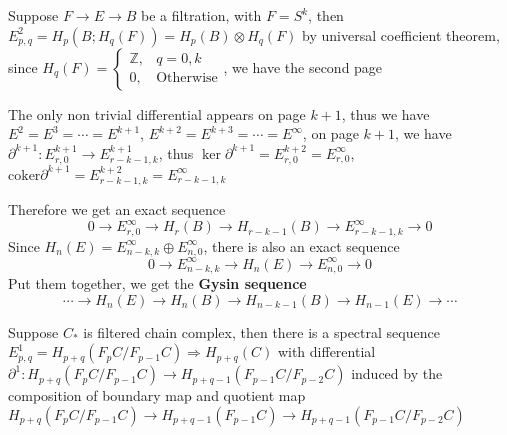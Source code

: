 \documentclass[../main.tex]{subfiles}
\begin{document}
\begin{example}
Suppose $F\to E\to B$ be a filtration, with $F=S^k$, then $E^2_{p,q}=H_p(B;H_q(F))=H_p(B)\otimes H_q(F)$ by universal coefficient theorem, since $H_q(F)=\begin{cases}
\mathbb Z, &q=0,k \\
0, &\text{Otherwise}
\end{cases}$, we have the second page
\begin{center}
\end{center}
The only non trivial differential appears on page $k+1$, thus we have $E^2=E^3=\cdots=E^{k+1}$, $E^{k+2}=E^{k+3}=\cdots=E^\infty$, on page $k+1$, we have $\partial^{k+1}:E^{k+1}_{r,0}\to E^{k+1}_{r-k-1,k}$, thus $\ker\partial^{k+1}=E^{k+2}_{r,0}=E^{\infty}_{r,0}$, $\mathrm{coker}\partial^{k+1}=E^{k+2}_{r-k-1,k}=E^{\infty}_{r-k-1,k}$
\begin{center}
\end{center}
Therefore we get an exact sequence
\[0\to E^\infty_{r,0}\to H_r(B)\to H_{r-k-1}(B)\to E^{\infty}_{r-k-1,k}\to0\]
Since $H_n(E)=E^\infty_{n-k,k}\oplus E^\infty_{n,0}$, there is also an exact sequence
\[0\to E^\infty_{n-k,k}\to H_n(E)\to E^\infty_{n,0}\to0\]
Put them together, we get the \textbf{Gysin sequence}
\[\cdots\to H_n(E)\to H_{n}(B)\to H_{n-k-1}(B)\to H_{n-1}(E)\to\cdots\]
\end{example}

\begin{theorem}
Suppose $C_*$ is filtered chain complex, then there is a spectral sequence $E^1_{p,q}=H_{p+q}(F_pC/F_{p-1}C)\Rightarrow H_{p+q}(C)$ with differential $\partial^1:H_{p+q}(F_pC/F_{p-1}C)\to H_{p+q-1}(F_{p-1}C/F_{p-2}C)$ induced by the composition of boundary map and quotient map 
$H_{p+q}(F_pC/F_{p-1}C)\to H_{p+q-1}(F_{p-1}C)\to H_{p+q-1}(F_{p-1}C/F_{p-2}C)$
\end{theorem}
\end{document}
